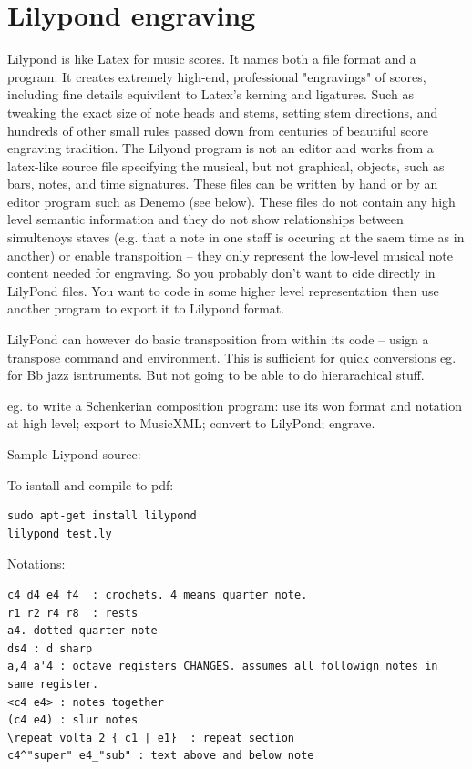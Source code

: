 \documentclass[oneside,english]{scrbook}
\begin{document}
\section{Lilypond engraving}
Lilypond is like Latex for music scores.  It names both a file format and a program.  It creates extremely high-end, professional "engravings" of scores, including fine details equivilent to Latex's kerning and ligatures. Such as tweaking the exact size of note heads and stems, setting stem directions, and hundreds of other small rules passed down from centuries of beautiful score engraving tradition.   The Lilyond program is not an editor and works from a latex-like source file specifying the musical, but not graphical, objects, such as bars, notes, and time signatures. These files can be written by hand or by an editor program such as Denemo (see below). These files do not contain any high level semantic information and they do not show relationships between simultenoys staves (e.g. that a note in one staff is occuring at the saem time as in another) or enable transpoition -- they only represent the low-level musical note content needed for engraving. So you probably don't want to cide directly in LilyPond files. You want to code in some higher level representation then use another program to export it to Lilypond format. 

LilyPond can however do basic transposition from within its code -- usign a transpose command and environment. This is sufficient for quick conversions eg. for Bb jazz isntruments. But not going to be able to do hierarachical stuff.

eg. to write a Schenkerian composition program: use its won format and notation at high level; export to MusicXML; convert to LilyPond; engrave.

Sample Liypond source:


To isntall and compile to pdf:

\begin{lstlisting}
sudo apt-get install lilypond
lilypond test.ly
\end{lstlisting}

Notations:
\begin{lstlisting}
c4 d4 e4 f4  : crochets. 4 means quarter note.
r1 r2 r4 r8  : rests
a4. dotted quarter-note
ds4 : d sharp
a,4 a'4 : octave registers CHANGES. assumes all followign notes in same register.
<c4 e4> : notes together
(c4 e4) : slur notes
\repeat volta 2 { c1 | e1}  : repeat section
c4^"super" e4_"sub" : text above and below note 
\end{lstlisting}
\end{document}
